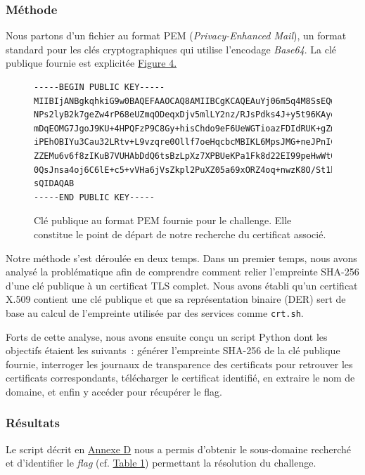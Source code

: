 \subsubsection{Méthode}
Nous partons d'un fichier au format PEM (\textit{Privacy-Enhanced Mail}), un format standard pour les clés cryptographiques qui utilise l'encodage \textit{Base64}. La clé publique fournie est explicitée \hyperref[fig:publicKey]{Figure 4.}

\begin{figure}[H]
    \centering
\begin{lstlisting}[numbers=none]
    -----BEGIN PUBLIC KEY-----
MIIBIjANBgkqhkiG9w0BAQEFAAOCAQ8AMIIBCgKCAQEAuYj06m5q4M8SsEQwKX+5
NPs2lyB2k7geZw4rP68eUZmqODeqxDjv5mlLY2nz/RJsPdks4J+y5t96KAyo3S5g
mDqEOMG7JgoJ9KU+4HPQFzP9C8Gy+hisChdo9eF6UeWGTioazFDIdRUK+gZm81c1
iPEhOBIYu3Cau32LRtv+L9vzqre0Ollf7oeHqcbcMBIKL6MpsJMG+neJPnICI36B
ZZEMu6v6f8zIKuB7VUHAbDdQ6tsBzLpXz7XPBUeKPa1Fk8d22EI99peHwWt0RuJP
0QsJnsa4oj6C6lE+c5+vVHa6jVsZkpl2PuXZ05a69xORZ4oq+nwzK8O/St1hbNBX
sQIDAQAB
-----END PUBLIC KEY-----
\end{lstlisting}
\caption{Clé publique au format PEM fournie pour le challenge. Elle constitue le point de départ de notre recherche du certificat associé.}
    \label{fig:publicKey}
\end{figure}

Notre méthode s'est déroulée en deux temps. Dans un premier temps, nous avons
analysé la problématique afin de comprendre comment relier l'empreinte SHA-256
d'une clé publique à un certificat TLS complet. Nous avons établi qu'un
certificat X.509 contient une clé publique et que sa représentation binaire
(DER) sert de base au calcul de l'empreinte utilisée par des services comme
\texttt{crt.sh}.

Forts de cette analyse, nous avons ensuite conçu un script Python dont les
objectifs étaient les suivants~: générer l'empreinte SHA-256 de la clé
publique fournie, interroger les journaux de transparence des certificats pour
retrouver les certificats correspondants, télécharger le certificat identifié,
en extraire le nom de domaine, et enfin y accéder pour récupérer le flag.
\subsubsection{Résultats}


Le script décrit en \hyperref[annexe:script-transparency]{Annexe D} nous a permis d'obtenir le sous-domaine recherché et d'identifier
le \textit{flag} (cf. \hyperref[tab:resultats-transparency]{Table 1}) permettant la résolution du challenge.

